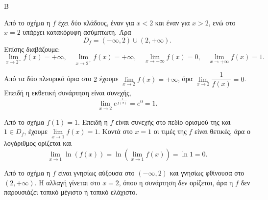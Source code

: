
\begin{thema}{Β}
\begin{erwthma}
\item Από το σχήμα η $f$ έχει δύο κλάδους, έναν για $x<2$ και έναν για $x>2$, ενώ στο $x=2$ υπάρχει κατακόρυφη ασύμπτωτη. Άρα
\[
D_f=(-\infty,2)\cup(2,+\infty).
\]
Επίσης διαβάζουμε:
\[
\lim_{x\to2^-}f(x)=+\infty,\quad
\lim_{x\to2^+}f(x)=+\infty,\quad
\lim_{x\to-\infty}f(x)=0,\quad
\lim_{x\to+\infty}f(x)=1.
\]

\item Από τα δύο πλευρικά όρια στο $2$ έχουμε $\lim\limits_{x\to2}f(x)=+\infty$, άρα $\lim\limits_{x\to2}\dfrac1{f(x)}=0$. Επειδή η εκθετική συνάρτηση είναι συνεχής,
\[
\lim_{x\to2}e^{\frac1{f(x)}}=e^0=1.
\]

\item Από το σχήμα $f(1)=1$. Επειδή η $f$ είναι συνεχής στο πεδίο ορισμού της και $1\in D_f$, έχουμε $\lim\limits_{x\to1}f(x)=1$. Κοντά στο $x=1$ οι τιμές της $f$ είναι θετικές, άρα ο λογάριθμος ορίζεται και
\[
\lim_{x\to1}\ln(f(x))=\ln\left(\lim_{x\to1}f(x)\right)=\ln1=0.
\]

\item Από το σχήμα η $f$ είναι γνησίως αύξουσα στο $(-\infty,2)$ και γνησίως φθίνουσα στο $(2,+\infty)$. Η αλλαγή γίνεται στο $x=2$, όπου η συνάρτηση δεν ορίζεται, άρα η $f$ δεν παρουσιάζει τοπικό μέγιστο ή τοπικό ελάχιστο.
\end{erwthma}
\end{thema}

